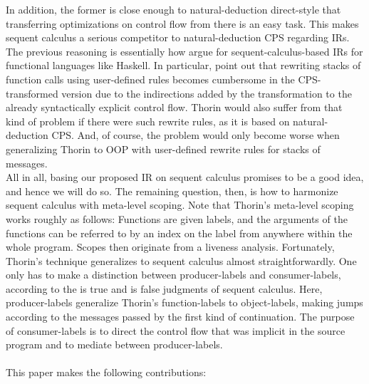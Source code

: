 In addition, the former is close enough to natural-deduction direct-style that transferring optimizations on control flow from there is an easy task.
This makes sequent calculus a serious competitor to natural-deduction CPS regarding IRs.
\\
The previous reasoning is essentially how \citet{downen2016sequent} argue for sequent-calculus-based IRs for functional languages like Haskell.
In particular, \citet{downen2016sequent} point out that rewriting stacks of function calls using user-defined rules becomes cumbersome in the CPS-transformed version due to the indirections added by the transformation to the already syntactically explicit control flow.
Thorin would also suffer from that kind of problem if there were such rewrite rules, as it is based on natural-deduction CPS.
And, of course, the problem would only become worse when generalizing Thorin to OOP with user-defined rewrite rules for stacks of messages.
\\
All in all, basing our proposed IR on sequent calculus promises to be a good idea, and hence we will do so.
The remaining question, then, is how to harmonize sequent calculus with meta-level scoping.
Note that Thorin's meta-level scoping works roughly as follows: Functions are given labels, and the arguments of the functions can be referred to by an index on the label from anywhere within the whole program.
Scopes then originate from a liveness analysis.
Fortunately, Thorin's technique generalizes to sequent calculus almost straightforwardly.
One only has to make a distinction between producer-labels and consumer-labels, according to the {\glqq}is true{\grqq} and {\glqq}is false{\grqq} judgments of sequent calculus.
Here, producer-labels generalize Thorin's function-labels to object-labels, making jumps according to the messages passed by the first kind of continuation.
The purpose of consumer-labels is to direct the control flow that was implicit in the source program and to mediate between producer-labels.
\\\\
This paper makes the following contributions:
